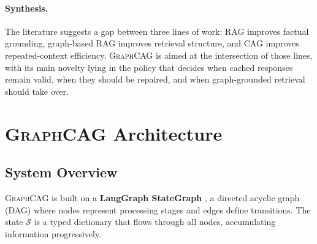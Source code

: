 \documentclass[11pt,a4paper,twocolumn]{article}
\newcommand{\graphcag}{\textsc{GraphCAG}}
\begin{document}
\paragraph{Synthesis.} The literature suggests a gap between three lines of work: RAG improves factual grounding, graph-based RAG improves retrieval structure, and CAG improves repeated-context efficiency. \graphcag{} is aimed at the intersection of those lines, with its main novelty lying in the policy that decides when cached responses remain valid, when they should be repaired, and when graph-grounded retrieval should take over.

\section{\graphcag{} Architecture}
\label{sec:architecture}

\subsection{System Overview}

\graphcag{} is built on a \textbf{LangGraph StateGraph} \cite{langgraph2024}, a directed acyclic graph (DAG) where nodes represent processing stages and edges define transitions. The state $\mathcal{S}$ is a typed dictionary that flows through all nodes, accumulating information progressively.
\end{document}
